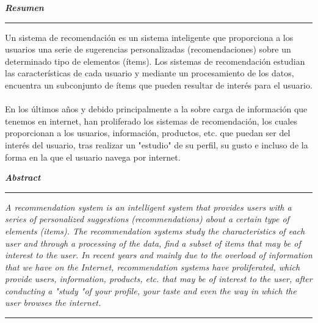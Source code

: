 \documentclass[11pt,a4paper]{article}
\begin{document}
		\textbf{\textit{\large Resumen}}\rule[1.5mm]{5mm}{0.1mm}		
		Un sistema de recomendación es un sistema inteligente que proporciona a los usuarios una serie de sugerencias personalizadas (recomendaciones) sobre un determinado tipo de elementos (ítems). Los sistemas de recomendación estudian las características de cada usuario y mediante un procesamiento de los datos, encuentra un subconjunto de ítems que pueden resultar de interés para el usuario.\\
		\\
		En los últimos años y debido principalmente a la sobre carga de información que tenemos en internet, han proliferado los sistemas de recomendación, los cuales proporcionan a los usuarios, información, productos, etc. que puedan ser del interés del usuario, tras realizar un "estudio" de su perfil, su gusto e incluso de la forma en la que el usuario navega por internet.
				
		\vspace{\baselineskip}
		
		\textbf{\textit{\large Abstract}}\rule[1.5mm]{5mm}{0.1mm} 		
		\textit{
			A recommendation system is an intelligent system that provides users with a series of personalized suggestions (recommendations) about a certain type of elements (items). The recommendation systems study the characteristics of each user and through a processing of the data, find a subset of items that may be of interest to the user.
			In recent years and mainly due to the overload of information that we have on the Internet, recommendation systems have proliferated, which provide users, information, products, etc. that may be of interest to the user, after conducting a "study "of your profile, your taste and even the way in which the user browses the internet.	
			\vspace{\baselineskip}			
		 }				
					
		\rule{150mm}{0.1mm}
		
		\newpage
		
\end{document}
